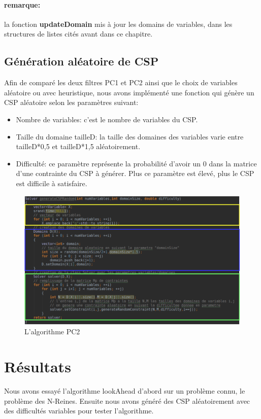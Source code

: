 \documentclass[12pt]{report}
\begin{document}
\paragraph{remarque:}
la fonction \textbf{updateDomain} mis à jour les domains de variables, dans les structures de listes cités avant dans ce chapitre.
\subsection{Génération aléatoire de CSP}
Afin de comparé les deux filtres PC1 et PC2 ainsi que le choix de variables aléatoire ou avec heuristique, nous avons implémenté une fonction qui génère un CSP aléatoire selon les paramètres suivant:
\begin{itemize}
	\item Nombre de variables: c’est le nombre de variables du CSP.
	
	\item Taille du domaine tailleD: la taille des domaines des variables varie entre tailleD*0,5 et tailleD*1,5 aléatoirement.
	
	\item Difficulté: ce paramètre représente la probabilité d’avoir un 0 dans la matrice d’une contrainte du CSP à générer. Plus ce paramètre est élevé, plus le CSP est difficile à satisfaire. 
\end{itemize}

\begin{figure}[H]
	\centering
	\includegraphics[scale=0.5]{imgs/random.png}
	\caption{L'algorithme PC2}
	\label{fig:Random}
\end{figure}

\section{Résultats}
Nous avons essayé l’algorithme lookAhead d’abord sur un problème connu, le problème des N-Reines. Ensuite nous avons généré des CSP aléatoirement avec des difficultés variables pour tester l’algorithme.
\end{document}
